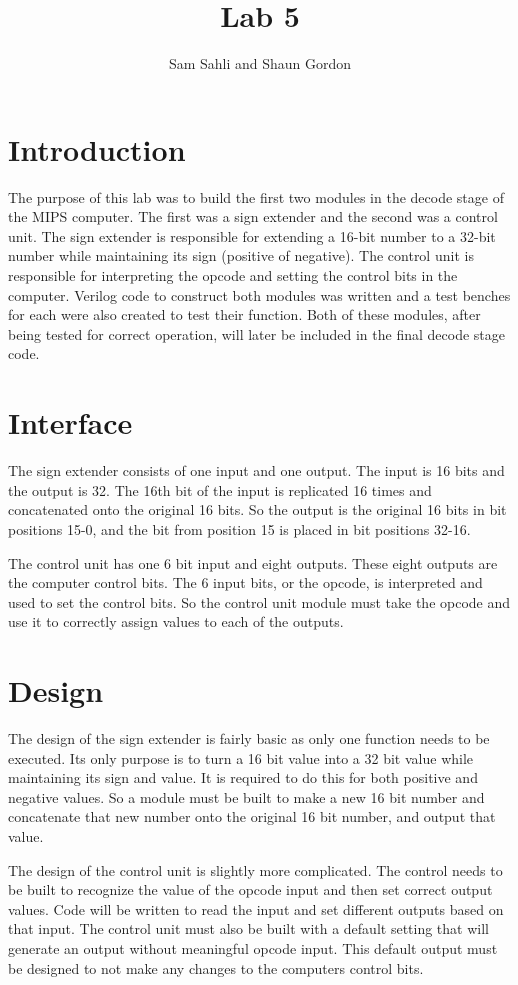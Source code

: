 \documentclass{article}
\author{Sam Sahli and Shaun Gordon}
\title{Lab 5}
\begin{document}
\maketitle

\section{Introduction}
The purpose of this lab was to build the first two modules in the decode stage of the MIPS computer. The first was a sign extender and the second was a control unit. The sign extender is responsible for extending a 16-bit number to a 32-bit number while maintaining its sign (positive of negative). The control unit is responsible for interpreting the opcode and setting the control bits in the computer. Verilog code to construct both modules was written and a test benches for each were also created to test their function. Both of these modules, after being tested for correct operation, will later be included in the final decode stage code.    

\section{Interface}
The sign extender consists of one input and one output. The input is 16 bits and the output is 32. The 16th bit of the input is replicated 16 times and concatenated onto the original 16 bits. So the output is the original 16 bits in bit positions 15-0, and the bit from position 15 is placed in bit positions 32-16. 

The control unit has one 6 bit input and eight outputs. These eight outputs are the computer control bits. The 6 input bits, or the opcode, is interpreted and used to set the control bits. So the control unit module must take the opcode and use it to correctly assign values to each of the outputs. 

\section{Design}
The design of the sign extender is fairly basic as only one function needs to be executed. Its only purpose is to turn a 16 bit value into a 32 bit value while maintaining its sign and value. It is required to do this for both positive and negative values. So a module must be built to make a new 16 bit number and concatenate that new number onto the original 16 bit number, and output that value. 

The design of the control unit is slightly more complicated. The control needs to be built to recognize the value of the opcode input and then set correct output values. Code will be written to read the input and set different outputs based on that input. The control unit must also be built with a default setting that will generate an output without meaningful opcode input. This default output must be designed to not make any changes to the computers control bits. 
\end{document}
